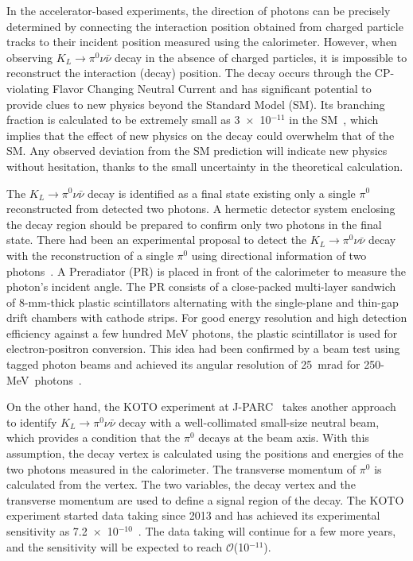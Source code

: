 \documentclass[12pt,times,draftclsnofoot,a4paper]{elsarticle}
\begin{document}
In the accelerator-based experiments, the direction of photons can be precisely determined by connecting the interaction position obtained from charged particle tracks to their incident position measured using the calorimeter. However, when observing $K_{L} \rightarrow \pi^{0}\nu\bar{\nu}$ decay in the absence of charged particles, it is impossible to reconstruct the interaction (decay) position. The decay occurs through the CP-violating Flavor Changing Neutral Current and has significant potential to provide clues to new physics beyond the Standard Model (SM). Its branching fraction is calculated to be extremely small as 3~$\times$~10$^{-11}$ in the SM~\cite{KOTOtheory}, which implies that the effect of new physics on the decay could overwhelm that of the SM. Any observed deviation from the SM prediction will indicate new physics without hesitation, thanks to the small uncertainty in the theoretical calculation.

The $K_{L} \rightarrow \pi^{0}\nu\bar{\nu}$ decay is identified as a final state existing only a single $\pi^{0}$ reconstructed from detected two photons. A hermetic detector system enclosing the decay region should be prepared to confirm only two photons in the final state. There had been an experimental proposal to detect the $K_{L} \rightarrow \pi^{0}\nu\bar{\nu}$ decay with the reconstruction of a single $\pi^{0}$ using directional information of two photons~\cite{KOPIO}. A Preradiator (PR) is placed in front of the calorimeter to measure the photon's incident angle. The PR consists of a close-packed multi-layer sandwich of 8-mm-thick plastic scintillators alternating with the single-plane and thin-gap drift chambers with cathode strips. For good energy resolution and high detection efficiency against a few hundred MeV photons, the plastic scintillator is used for electron-positron conversion. This idea had been confirmed by a beam test using tagged photon beams and achieved its angular resolution of 25~mrad for 250-MeV~photons~\cite{KOPIOcdr}.

On the other hand, the KOTO experiment at J-PARC~\cite{KOTOexp} takes another approach to identify $K_{L} \rightarrow \pi^{0}\nu\bar{\nu}$ decay with a well-collimated small-size neutral beam, which provides a condition that the $\pi^{0}$ decays at the beam axis. With this assumption, the decay vertex is calculated using the positions and energies of the two photons measured in the calorimeter. The transverse momentum of $\pi^{0}$ is calculated from the vertex. The two variables, the decay vertex and the transverse momentum are used to define a signal region of the decay. The KOTO experiment started data taking since 2013 and has achieved its experimental sensitivity as 7.2~$\times$~10$^{-10}$~\cite{KOTOexp}. The data taking will continue for a few more years, and the sensitivity will be expected to reach $\mathcal{O}$(10$^{-11}$).
\end{document}
